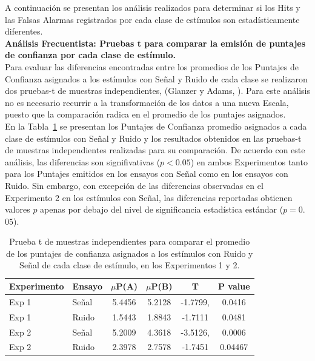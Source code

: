A continuación se presentan los análisis realizados para determinar si los Hits y las Falsas Alarmas registrados por cada clase de estímulos son estadísticamente diferentes.\\

\textbf{Análisis Frecuentista: Pruebas t para comparar la emisión de puntajes de confianza por cada clase de estímulo.}\\

Para evaluar las diferencias encontradas entre los promedios de los Puntajes de Confianza asignados a los estímulos con Señal y Ruido de cada clase se realizaron  dos pruebas-t de muestras independientes, (Glanzer y Adams, \citeyear{Glanzer1990}). Para este análisis no es necesario recurrir a la transformación de los datos a una nueva Escala, puesto que la comparación radica en el promedio de los puntajes asignados.\\

En la Tabla~\ref{Tabla_t-Confidence} se presentan los Puntajes de Confianza promedio asignados a cada clase de estímulos con Señal y Ruido y los resultados obtenidos en las pruebas-t de muestras independientes realizadas para su comparación. De acuerdo con este análisis, las diferencias son signifivativas ($p<0.05$) en ambos Experimentos tanto para los Puntajes emitidos  en los ensayos con Señal como en los ensayos con Ruido. Sin embargo, con excepción de las diferencias observadas en el Experimento 2 en los estímulos con Señal, las diferencias reportadas obtienen valores $p$ apenas por debajo del nivel de significancia estadística estándar ($p=0$.$05$).\\

\begin{table}
\caption[Prueba t para evaluar las diferencias entre los puntajes de confianza asignados en promedio a los estímulos con señal y ruido de cada clase]{Prueba t de muestras independientes para comparar el promedio de los puntajes de confianza asignados a los estímulos con Ruido y Señal de cada clase de estímulo, en los Experimentos 1 y 2.}
\label{Tabla_t-Confidence}
\centering
\begin{tabular}{l l |  c c c c}
\toprule
\textbf{Experimento} & \textbf{Ensayo} & \textbf{$\mu$P(A)} & \textbf{$\mu$P(B)} & \textbf{T} & \textbf{P value}\\
\midrule
Exp 1 & Señal & 5.4456 & 5.2128 & -1.7799, & 0.0416 \\
Exp 1 & Ruido & 1.5443 & 1.8843 & -1.7111 & 0.0481 \\
Exp 2 & Señal & 5.2009 & 4.3618  & -3.5126, & 0.0006 \\
Exp 2 & Ruido & 2.3978 & 2.7578 & -1.7451 & 0.04467 \\
\bottomrule
\end{tabular}
\end{table}


